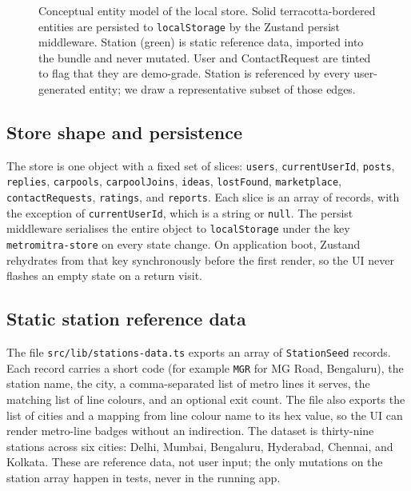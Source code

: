 \documentclass[a4paper,11pt]{article}
\begin{document}
\begin{figure}[ht]
\caption{Conceptual entity model of the local store. Solid terracotta-bordered
entities are persisted to \texttt{localStorage} by the Zustand persist
middleware. Station (green) is static reference data, imported into the bundle
and never mutated. User and ContactRequest are tinted to flag that they are
demo-grade. Station is referenced by every user-generated entity; we draw a
representative subset of those edges.}
\label{fig:entities}
\end{figure}

\subsection{Store shape and persistence}

The store is one object with a fixed set of slices: \texttt{users},
\texttt{currentUserId}, \texttt{posts}, \texttt{replies}, \texttt{carpools},
\texttt{carpoolJoins}, \texttt{ideas}, \texttt{lostFound}, \texttt{marketplace},
\texttt{contactRequests}, \texttt{ratings}, and \texttt{reports}. Each slice is
an array of records, with the exception of \texttt{currentUserId}, which is a
string or \texttt{null}. The persist middleware serialises the entire object to
\texttt{localStorage} under the key \texttt{metromitra-store} on every state
change. On application boot, Zustand rehydrates from that key synchronously
before the first render, so the UI never flashes an empty state on a return
visit.

\subsection{Static station reference data}

The file \texttt{src/lib/stations-data.ts} exports an array of
\texttt{StationSeed} records. Each record carries a short code (for example
\texttt{MGR} for MG Road, Bengaluru), the station name, the city, a
comma-separated list of metro lines it serves, the matching list of line
colours, and an optional exit count. The file also exports the list of cities
and a mapping from line colour name to its hex value, so the UI can render
metro-line badges without an indirection. The dataset is thirty-nine stations
across six cities: Delhi, Mumbai, Bengaluru, Hyderabad, Chennai, and Kolkata.
These are reference data, not user input; the only mutations on the station
array happen in tests, never in the running app.
\end{document}
